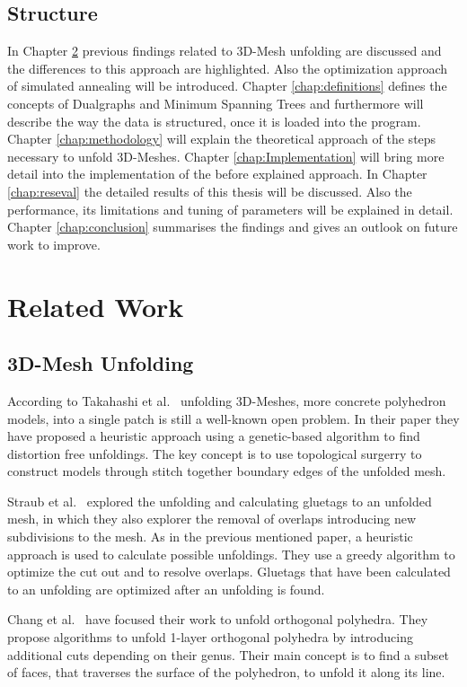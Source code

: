 \documentclass[draft,final]{vutinfth} %
\begin{document}
\section{Structure}
In Chapter \ref{chap:relatedwork} previous findings related to 3D-Mesh unfolding are discussed and the differences to this approach are highlighted. Also the optimization approach of simulated annealing will be introduced. Chapter \ref{chap:definitions} defines the concepts of Dualgraphs and Minimum Spanning Trees and furthermore will describe the way the data is structured, once it is loaded into the program. Chapter \ref{chap:methodology} will explain the theoretical approach of the steps necessary to unfold 3D-Meshes. Chapter \ref{chap:Implementation} will bring more detail into the implementation of the before explained approach. In Chapter \ref{chap:reseval} the detailed results of this thesis will be discussed. Also the performance, its limitations and tuning of parameters will be explained in detail. Chapter \ref{chap:conclusion} summarises the findings and gives an outlook on future work to improve.

\chapter{Related Work}
\label{chap:relatedwork}

\section{3D-Mesh Unfolding}
According to Takahashi et al.~\cite{takahashi2011optimized} unfolding 3D-Meshes, more concrete polyhedron models, into a single patch is still a well-known open problem. In their paper they have proposed a heuristic approach using a genetic-based algorithm to find distortion free unfoldings. The key concept is to use topological surgerry to construct models through stitch together boundary edges of the unfolded mesh.

Straub et al.~\cite{straubcreating} explored the unfolding and calculating gluetags to an unfolded mesh, in which they also explorer the removal of overlaps introducing new subdivisions to the mesh. As in the previous mentioned paper, a heuristic approach is used to calculate possible unfoldings. They use a greedy algorithm to optimize the cut out and to resolve overlaps. Gluetags that have been calculated to an unfolding are optimized after an unfolding is found.

Chang et al.~\cite{xi2016learning} have focused their work to unfold orthogonal polyhedra. They propose algorithms to unfold 1-layer orthogonal polyhedra by introducing additional cuts depending on their genus. Their main concept is to find a subset of faces, that traverses the surface of the polyhedron, to unfold it along its line. 
\end{document}
